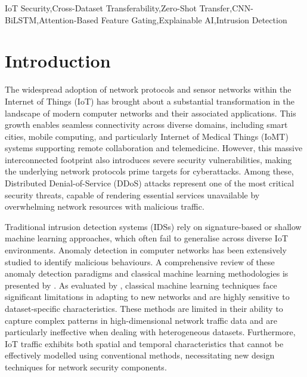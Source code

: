 \documentclass[a4paper,fleqn]{cas-sc}
\begin{document}


\begin{keywords}
IoT Security\sep Cross-Dataset Transferability\sep Zero-Shot Transfer\sep CNN-BiLSTM\sep Attention-Based Feature Gating\sep Explainable AI\sep Intrusion Detection
\end{keywords}

\maketitle

\section{Introduction}
\label{sec:intro}
The widespread adoption of network protocols and sensor networks within the Internet of Things (IoT) has brought about a substantial transformation in the landscape of modern computer networks and their associated applications. This growth enables seamless connectivity across diverse domains, including smart cities, mobile computing, and particularly Internet of Medical Things (IoMT) systems supporting remote collaboration and telemedicine. However, this massive interconnected footprint also introduces severe security vulnerabilities, making the underlying network protocols prime targets for cyberattacks. Among these, Distributed Denial-of-Service (DDoS) attacks represent one of the most critical security threats, capable of rendering essential services unavailable by overwhelming network resources with malicious traffic.

Traditional intrusion detection systems (IDSs) rely on signature-based or shallow machine learning approaches, which often fail to generalise across diverse IoT environments. Anomaly detection in computer networks has been extensively studied to identify malicious behaviours. A comprehensive review of these anomaly detection paradigms and classical machine learning methodologies is presented by \cite{AHMED201619}. As evaluated by \cite{sarhan2020evaluation}, classical machine learning techniques face significant limitations in adapting to new networks and are highly sensitive to dataset-specific characteristics. These methods are limited in their ability to capture complex patterns in high-dimensional network traffic data and are particularly ineffective when dealing with heterogeneous datasets. Furthermore, IoT traffic exhibits both spatial and temporal characteristics that cannot be effectively modelled using conventional methods, necessitating new design techniques for network security components.
\end{document}
